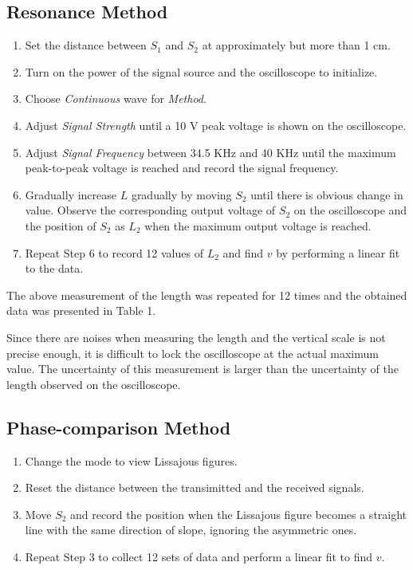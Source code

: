 \documentclass[a4paper]{report}
\begin{document}
	\subsection{Resonance Method}
	\begin{enumerate}[1.]
		\item Set the distance between $S_1$ and $S_2$ at approximately but more than 1 cm.
		\item Turn on the power of the signal source and the oscilloscope to initialize.
		\item Choose \textit{Continuous} wave for \textit{Method}.
		\item Adjust \textit{Signal Strength} until a 10 V peak voltage is shown on the oscilloscope.
		\item Adjust \textit{Signal Frequency} between 34.5 KHz and 40 KHz until the maximum peak-to-peak voltage is reached and record the signal frequency.
		\item Gradually increase $L$ gradually by moving $S_2$ until there is obvious change in value. Observe the corresponding output voltage of $S_2$ on the oscilloscope and the position of $S_2$ as $L_2$ when the maximum output voltage is reached.
		\item Repeat Step 6 to record 12 values of $L_2$ and find $v$ by performing a linear fit to the data.
	\end{enumerate}

	The above measurement of the length was repeated for 12 times and the obtained data was presented in Table 1.
	
	Since there are noises when measuring the length and the vertical scale is not precise enough, it is difficult to lock the oscilloscope at the actual maximum value. The uncertainty of this measurement is larger than the uncertainty of the length observed on the oscilloscope.
	\subsection{Phase-comparison Method}
	\begin{enumerate}[1.]
		\item Change the mode to view Lissajous figures.
		\item Reset the distance between the transimitted and the received signals.
		\item Move $S_2$ and record the position when the Lissajous figure becomes a straight line with the same direction of slope, ignoring the asymmetric ones.
		\item Repeat Step 3 to collect 12 sets of data and perform a linear fit to find $v$.
	\end{enumerate}
\end{document}
